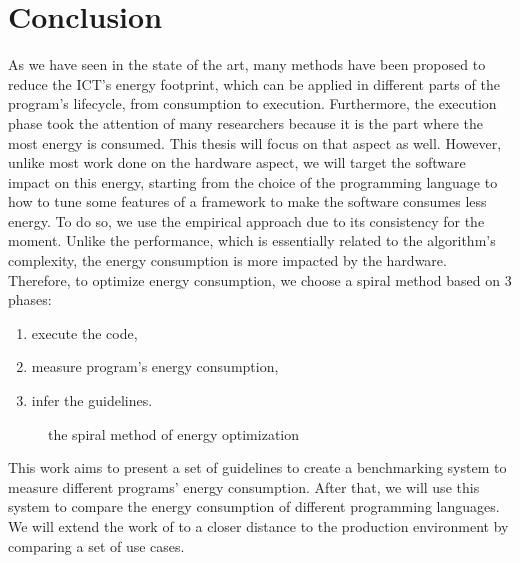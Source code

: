 \section{Conclusion}
As we have seen in the state of the art, many methods have been proposed to reduce the ICT's energy footprint, which can be applied in different parts of the program's lifecycle, from consumption to execution.
Furthermore, the execution phase took the attention of many researchers because it is the part where the most energy is consumed.
This thesis will focus on that aspect as well.
However, unlike most work done on the hardware aspect, we will target the software impact on this energy, starting from the choice of the programming language to how to tune some features of a framework to make the software consumes less energy.
To do so, we use the empirical approach due to its consistency for the moment.
Unlike the performance, which is essentially related to the algorithm's complexity, the energy consumption is more impacted by the hardware.
Therefore, to optimize energy consumption, we choose a spiral method based on 3 phases:
\begin{enumerate}
    \item execute the code,
    \item measure program's energy consumption,
    \item infer the guidelines.
\end{enumerate}

\begin{figure}[!hbt]
    \caption{the spiral method of energy optimization }\label{fig:spirals}
\end{figure}


This work aims to present a set of guidelines to create a benchmarking system to measure different programs' energy consumption.
After that, we will use this system to compare the energy consumption of different programming languages. We will extend the work of \citeauthor{pereira_energy_2017} to a closer distance to the production environment by comparing a set of use cases.

